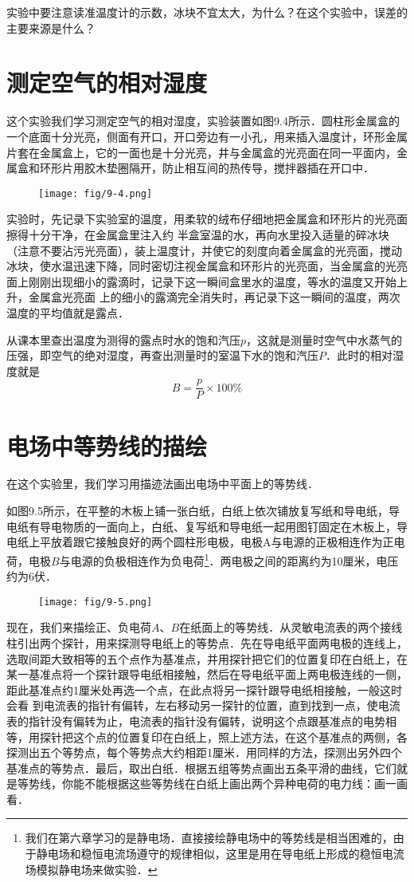 实验中要注意读准温度计的示数，冰块不宜太大，为什么？在这个实验中，误差的主要来源是什么？

\section{测定空气的相对湿度}
这个实验我们学习测定空气的相对湿度，实验装置如图9.4所示．圆柱形金属盒的一个底面十分光亮，侧面有开口，开口旁边有一小孔，用来插入温度计，环形金属片套在金属盒上，它的一面也是十分光亮，井与金属盒的光亮面在同一平面内，金属盒和环形片用胶木垫圈隔开，防止相互间的热传导，搅拌器插在开口中．
\begin{figure}[htp]\centering
    \texttt{[image: fig/9-4.png]}
    \caption{}
    \end{figure}

实验时，先记录下实验室的温度，用柔软的绒布仔细地把金属盒和环形片的光亮面擦得十分干净，在金属盒里注入约
半盒室温的水，再向水里投入适量的碎冰块（注意不要沾污光亮面），装上温度计，并使它的刻度向着金属盒的光亮面，搅动冰块，使水温迅速下降，同时密切注视金属盒和环形片的光亮面，当金属盒的光亮面上刚刚出现细小的露滴时，记录下这一瞬间盒里水的温度，等水的温度又开始上升，金属盒光亮面
上的细小的露滴完全消失时，再记录下这一瞬间的温度，两次温度的平均值就是露点．

从课本里查出温度为测得的露点时水的饱和汽压$p$，这就是测量时空气中水蒸气的压强，即空气的绝对湿度，再查出测量时的室温下水的饱和汽压$P$．此时的相对湿度就是
\[B=\frac{p}{P}\times 100\%\]

\section{电场中等势线的描绘}
在这个实验里，我们学习用描迹法画出电场中平面上的等势线．

如图9.5所示，在平整的木板上铺一张白纸，白纸上依次铺放复写纸和导电纸，导电纸有导电物质的一面向上，白纸、复写纸和导电纸一起用图钉固定在木板上，导电纸上平放着跟它接触良好的两个圆柱形电极，电极A与电源的正极相连作为正电荷，电极$B$与电源的负极相连作为负电荷\footnote{我们在第六章学习的是静电场．直接接绘静电场中的等势线是相当困难的，由于静电场和稳恒电流场遵守的规律相似，这里是用在导电纸上形成的稳恒电流场模拟静电场来做实验．}．两电极之间的距离约为10厘米，电压约为6伏．
\begin{figure}[htp]\centering
    \texttt{[image: fig/9-5.png]}
    \caption{}
    \end{figure}

现在，我们来描绘正、负电荷$A$、$B$在纸面上的等势线．从灵敏电流表的两个接线柱引出两个探针，用来探测导电纸上的等势点．先在导电纸平面两电极的连线上，选取间距大致相等的五个点作为基准点，并用探针把它们的位置复印在白纸上，在某一基准点将一个探针跟导电纸相接触，然后在导电纸平面上两电极连线的一侧，距此基准点约1厘米处再选一个点，在此点将另一探针跟导电纸相接触，一般这时会看
到电流表的指针有偏转，左右移动另一探针的位置，直到找到一点，使电流表的指针没有偏转为止，电流表的指针没有偏转，说明这个点跟基准点的电势相等，用探针把这个点的位置复印在白纸上，照上述方法，在这个基准点的两侧，各探测出五个等势点，每个等势点大约相距1厘米．用同样的方法，探测出另外四个基准点的等势点．最后，取出白纸．根据五组等势点画出五条平滑的曲线，它们就是等势线，你能不能根据这些等势线在白纸上画出两个异种电荷的电力线：画一画看．

